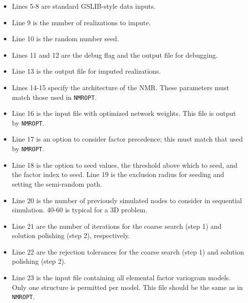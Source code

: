 \begin{itemize}[noitemsep]
   \item Lines 5-8 are standard GSLIB-style data inputs.
   \item Line 9 is the number of realizations to impute.
   \item Line 10 is the random number seed.
   \item Lines 11 and 12 are the debug flag and the output file for debugging.
   \item Line 13 is the output file for imputed realizations.
   \item Lines 14-15 specify the architecture of the NMR. These parameters must match those used in \texttt{NMROPT}.
   \item Line 16 is the input file with optimized network weights. This file is output by \texttt{NMROPT}.
   \item Line 17 is an option to consider factor precedence; this must match that used by \texttt{NMROPT}.
   \item Line 18 is the option to seed values, the threshold above which to seed, and the factor index to seed. Line 19 is the exclusion radius for seeding and setting the semi-random path.
   \item Line 20 is the number of previously simulated nodes to consider in sequential simulation. 40-60 is typical for a 3D problem.
   \item Line 21 are the number of iterations for the coarse search (step 1) and solution polishing (step 2), respectively.
   \item Line 22 are the rejection tolerances for the coarse search (step 1) and solution polishing (step 2).
   \item Line 23 is the input file containing all elemental factor variogram models. Only one structure is permitted per model. This file should be the same as in \texttt{NMROPT}.
\end{itemize}




